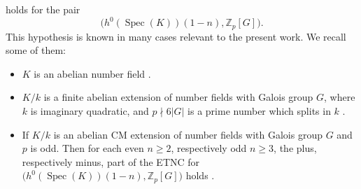 \documentclass[a4paper,11pt]{article}
\begin{document}
holds for the pair
\[
\bigl(h^0(\operatorname{Spec}(K))(1-n),\mathbb Z_p[G]\bigr).
\]
This hypothesis is known in many cases relevant to the present work. We recall
some of them:
\begin{itemize}
    \item \(K\) is an abelian number field \cite{BunsG1}.
    
    \item \(K/k\) is a finite abelian extension of number fields with Galois
    group \(G\), where \(k\) is imaginary quadratic, and \(p\nmid 6|G|\) is a
    prime number which splits in \(k\) \cite{Leung}.
    
    \item If \(K/k\) is an abelian CM extension of number fields with Galois group
    \(G\) and  \(p\) is odd.
    Then
    for each even \(n\geq 2\), respectively odd \(n\geq 3\), the plus,
    respectively minus, part of the ETNC for
    \(
    \bigl(h^0(\operatorname{Spec}(K))(1-n),\mathbb Z_p[G]\bigr)
    \)
    holds 
   \cite{JohnstonNickel}.
\end{itemize}
\end{document}
